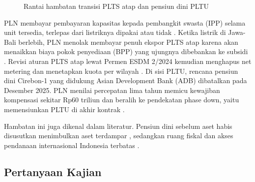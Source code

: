 \begin{figure}[H]
\centering
{}
\caption{Rantai hambatan transisi PLTS atap dan pensiun dini PLTU}
\label{fig:rantai}
\end{figure}

PLN membayar pembayaran kapasitas kepada pembangkit swasta (IPP) selama unit tersedia, terlepas dari listriknya dipakai atau tidak \parencite{P-IEEFA-2017}. Ketika listrik di Jawa-Bali berlebih, PLN menolak membayar penuh ekspor PLTS atap karena akan menaikkan biaya pokok penyediaan (BPP) yang ujungnya dibebankan ke subsidi \parencite{B-TENGGARA-2024}. Revisi aturan PLTS atap lewat Permen ESDM 2/2024 kemudian menghapus net metering dan menetapkan kuota per wilayah \parencite{R-PERMEN-ESDM-2-2024,B-TENGGARA-2024}. Di sisi PLTU, rencana pensiun dini Cirebon-1 yang didukung Asian Development Bank (ADB) dibatalkan pada Desember 2025. PLN menilai percepatan lima tahun memicu kewajiban kompensasi sekitar Rp60 triliun dan beralih ke pendekatan phase down, yaitu memensiunkan PLTU di akhir kontrak \parencite{B-PETROMINDO-CIREBON-BATAL,B-MONGABAY-202601}.

Hambatan ini juga dikenal dalam literatur. Pensiun dini sebelum aset habis disusutkan menimbulkan aset terdampar \parencite{P-KEFFORD-2018}, sedangkan ruang fiskal dan akses pendanaan internasional Indonesia terbatas \parencite{P-RESOSUDARMO-2023}.

\subsection{Pertanyaan Kajian}

